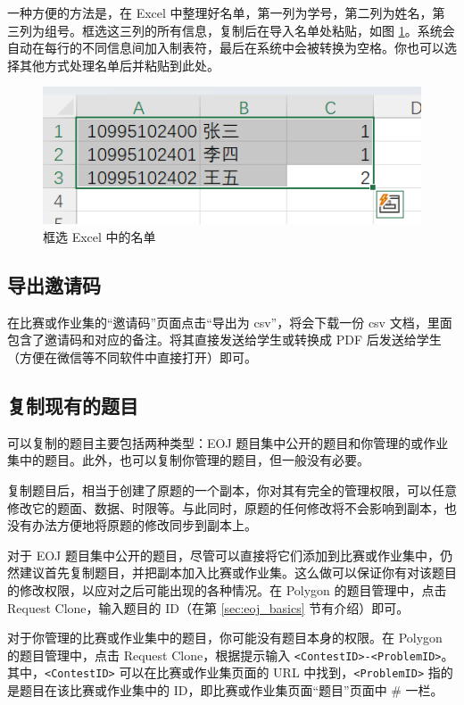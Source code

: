 \documentclass[oneside]{book}
\begin{document}
一种方便的方法是，在 Excel 中整理好名单，第一列为学号，第二列为姓名，第三列为组号。框选这三列的所有信息，复制后在导入名单处粘贴，如图 \ref{fig:excel}。系统会自动在每行的不同信息间加入制表符，最后在系统中会被转换为空格。你也可以选择其他方式处理名单后并粘贴到此处。

\begin{figure}[htbp]
  \centering
  \includegraphics[width=.5\textwidth]{res/excel.png}
  \caption{框选 Excel 中的名单}
  \label{fig:excel}
\end{figure}

\subsection{导出邀请码}

\label{ssec:export_inviting_code}

在比赛或作业集的``邀请码''页面点击``导出为 csv''，将会下载一份 csv 文档，里面包含了邀请码和对应的备注。将其直接发送给学生或转换成 PDF 后发送给学生（方便在微信等不同软件中直接打开）即可。

\subsection{复制现有的题目}

\label{ssec:copy_exist_problem}

可以复制的题目主要包括两种类型：EOJ 题目集中公开的题目和你管理的或作业集中的题目。此外，也可以复制你管理的题目，但一般没有必要。

复制题目后，相当于创建了原题的一个副本，你对其有完全的管理权限，可以任意修改它的题面、数据、时限等。与此同时，原题的任何修改将不会影响到副本，也没有办法方便地将原题的修改同步到副本上。

对于 EOJ 题目集中公开的题目，尽管可以直接将它们添加到比赛或作业集中，仍然建议首先复制题目，并把副本加入比赛或作业集。这么做可以保证你有对该题目的修改权限，以应对之后可能出现的各种情况。在 Polygon 的题目管理中，点击 Request Clone，输入题目的 ID（在第 \ref{sec:eoj_basics} 节有介绍）即可。

对于你管理的比赛或作业集中的题目，你可能没有题目本身的权限。在 Polygon 的题目管理中，点击 Request Clone，根据提示输入 \lstinline{<ContestID>-<ProblemID>}。其中，\lstinline{<ContestID>} 可以在比赛或作业集页面的 URL 中找到，\lstinline{<ProblemID>} 指的是题目在该比赛或作业集中的 ID，即比赛或作业集页面``题目''页面中 \# 一栏。
\end{document}
